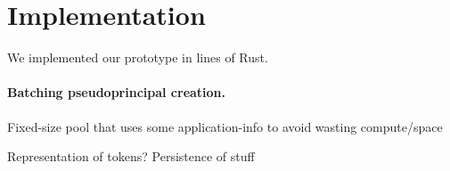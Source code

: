 \section{Implementation}

%
We implemented our \sys prototype in  lines of Rust.
%

\paragraph{Batching pseudoprincipal creation.}
%
Fixed-size pool that uses some application-info to avoid wasting compute/space

Representation of tokens? Persistence of stuff

